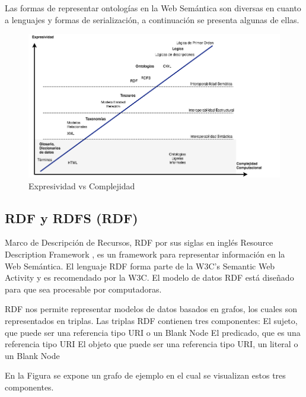 Las formas de representar ontologías en la Web Semántica son diversas en cuanto a lenguajes y formas de serialización, a continuación se presenta algunas de ellas.

    \begin{figure}[h!]
    \centering
    \includegraphics[width=150mm]{figuras/Diagramas-ComplejidadOntologica}
    \caption{Expresividad vs Complejidad}
    \label{img:expresividad complejidad }
    \end{figure}



\subsection{RDF y RDFS (RDF)}

Marco de Descripción de Recursos, RDF por sus siglas en inglés Resource Description Framework \cite{rdf}, es un framework para representar información en la Web Semántica. El lenguaje RDF forma parte de la W3C's Semantic Web Activity y es recomendado por la W3C. El modelo de datos RDF está diseñado para que sea procesable por computadoras. 

RDF nos permite representar modelos de datos basados en grafos, los cuales son representados en triplas. Las triplas RDF contienen tres componentes:
El sujeto, que puede ser una referencia tipo URI o un Blank Node
El predicado, que es una referencia tipo URI
El objeto que puede ser una referencia tipo URI, un literal o un Blank Node

En la Figura  se expone un grafo de ejemplo en el cual se visualizan estos tres componentes.
